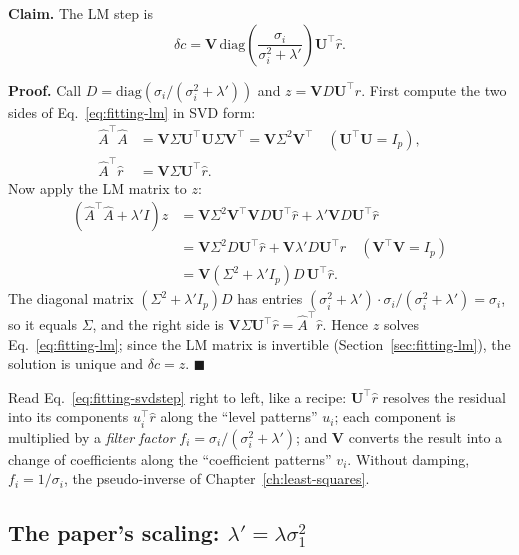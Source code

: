 \textbf{Claim.} The LM step is
\begin{equation}
\delta c=\bm V\,\mathrm{diag}\!\left(\frac{\sigma_i}{\sigma_i^2+\lambda'}\right)\bm U^\top\hat r .
\label{eq:fitting-svdstep}
\end{equation}

\textbf{Proof.} Call $D=\mathrm{diag}(\sigma_i/(\sigma_i^2+\lambda'))$ and $z=\bm VD\bm U^\top\hat r$. First compute the two sides of Eq.~\eqref{eq:fitting-lm} in SVD form:
\begin{align*}
\hat A^\top\hat A&=\bm V\Sigma\bm U^\top\bm U\Sigma\bm V^\top=\bm V\Sigma^2\bm V^\top\quad(\bm U^\top\bm U=I_p),\\
\hat A^\top\hat r&=\bm V\Sigma\bm U^\top\hat r .
\end{align*}
Now apply the LM matrix to $z$:
\begin{align*}
(\hat A^\top\hat A+\lambda'I)z&=\bm V\Sigma^2\bm V^\top\bm VD\bm U^\top\hat r+\lambda'\bm VD\bm U^\top\hat r\\
&=\bm V\Sigma^2D\bm U^\top\hat r+\bm V\lambda'D\bm U^\top\hat r\quad(\bm V^\top\bm V=I_p)\\
&=\bm V(\Sigma^2+\lambda'I_p)D\,\bm U^\top\hat r .
\end{align*}
The diagonal matrix $(\Sigma^2+\lambda'I_p)D$ has entries $(\sigma_i^2+\lambda')\cdot\sigma_i/(\sigma_i^2+\lambda')=\sigma_i$, so it equals $\Sigma$, and the right side is $\bm V\Sigma\bm U^\top\hat r=\hat A^\top\hat r$. Hence $z$ solves Eq.~\eqref{eq:fitting-lm}; since the LM matrix is invertible (Section~\ref{sec:fitting-lm}), the solution is unique and $\delta c=z$. $\blacksquare$

Read Eq.~\eqref{eq:fitting-svdstep} right to left, like a recipe: $\bm U^\top\hat r$ resolves the residual into its components $u_i^\top\hat r$ along the ``level patterns'' $u_i$; each component is multiplied by a \emph{filter factor} $f_i=\sigma_i/(\sigma_i^2+\lambda')$; and $\bm V$ converts the result into a change of coefficients along the ``coefficient patterns'' $v_i$. Without damping, $f_i=1/\sigma_i$, the pseudo-inverse of Chapter~\ref{ch:least-squares}.

\subsection{The paper's scaling: $\lambda'=\lambda\sigma_1^2$}

